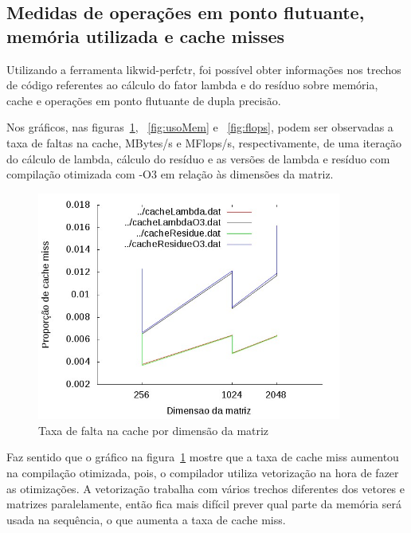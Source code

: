 \documentclass[12pt]{article}
\begin{document}
\subsection{Medidas de operações em ponto flutuante, memória utilizada e cache
misses}\label{sec:FlopsMemCache}

Utilizando a ferramenta likwid-perfctr, foi possível obter informações nos
trechos de código referentes ao cálculo do fator lambda e do resíduo sobre
memória, cache e operações em ponto flutuante de dupla precisão.

Nos gráficos, nas figuras~\ref{fig:cacheMiss}, ~\ref{fig:usoMem} e
~\ref{fig:flops}, podem ser observadas a taxa de faltas na cache, MBytes/s e
MFlops/s, respectivamente, de uma iteração do cálculo de lambda, cálculo do
resíduo e as versões de lambda e resíduo com compilação otimizada com -O3 em
relação às dimensões da matriz.

\begin{figure}[htb] \begin{center}
\includegraphics[width=100mm]{img/cacheMiss.jpg} \end{center}
\caption{Taxa de falta na cache por dimensão da matriz}\label{fig:cacheMiss}
\end{figure}

Faz sentido que o gráfico na figura~\ref{fig:cacheMiss} mostre que a taxa de
cache miss aumentou na compilação otimizada, pois, o compilador utiliza
vetorização na hora de fazer as otimizações. A vetorização trabalha com vários
trechos diferentes dos vetores e matrizes paralelamente, então fica mais difícil
prever qual parte da memória será usada na sequência, o que aumenta a taxa de
cache miss.
\end{document}
